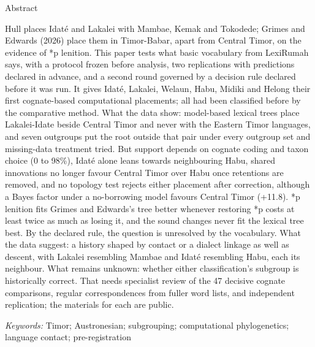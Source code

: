 \vspace{8mm}
\colorbox{paperlight}{\parbox{\dimexpr\textwidth-2\fboxsep\relax}{%
\vspace{2.5mm}
\hspace*{3mm}\parbox{\dimexpr\textwidth-2\fboxsep-6mm\relax}{\linespread{1.08}\selectfont\small
{\heading\color{ink}Abstract}\par\vspace{1.5mm}
Hull places Idaté and Lakalei with Mambae, Kemak and Tokodede; Grimes and Edwards (2026) place them in Timor-Babar, apart from Central Timor, on the evidence of *p lenition. This paper tests what basic vocabulary from LexiRumah says, with a protocol frozen before analysis, two replications with predictions declared in advance, and a second round governed by a decision rule declared before it was run. It gives Idaté, Lakalei, Welaun, Habu, Midiki and Helong their first cognate-based computational placements; all had been classified before by the comparative method. What the data show: model-based lexical trees place Lakalei-Idate beside Central Timor and never with the Eastern Timor languages, and seven outgroups put the root outside that pair under every outgroup set and missing-data treatment tried. But support depends on cognate coding and taxon choice (0 to 98\%), Idaté alone leans towards neighbouring Habu, shared innovations no longer favour Central Timor over Habu once retentions are removed, and no topology test rejects either placement after correction, although a Bayes factor under a no-borrowing model favours Central Timor (+11.8). *p lenition fits Grimes and Edwards's tree better whenever restoring *p costs at least twice as much as losing it, and the sound changes never fit the lexical tree best. By the declared rule, the question is unresolved by the vocabulary. What the data suggest: a history shaped by contact or a dialect linkage as well as descent, with Lakalei resembling Mambae and Idaté resembling Habu, each its neighbour. What remains unknown: whether either classification's subgroup is historically correct. That needs specialist review of the 47 decisive cognate comparisons, regular correspondences from fuller word lists, and independent replication; the materials for each are public.\par
\vspace{2mm}
{\headingregular\itshape\color{ink2}Keywords:} Timor; Austronesian; subgrouping; computational phylogenetics; language contact; pre-registration\par}
\vspace{3mm}}}
\endgroup
\vspace{4mm}
